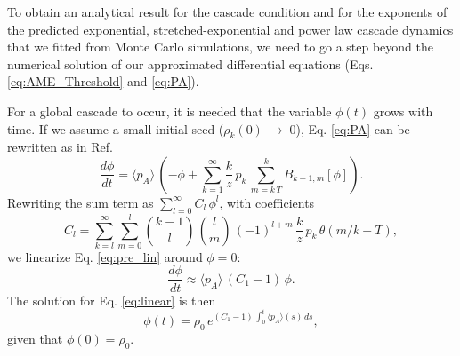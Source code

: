 To obtain an analytical result for the cascade condition and for the exponents of the predicted exponential, stretched-exponential and power law cascade dynamics that we fitted from Monte Carlo simulations, we need to go a step beyond the numerical solution of our approximated differential equations (Eqs. \eqref{eq:AME_Threshold} and \eqref{eq:PA}). 

For a global cascade to occur, it is needed that the variable $\phi(t)$ grows with time. If we assume a small initial seed ($\rho_k (0) \; \to \; 0$), Eq. \eqref{eq:PA} can be rewritten as in Ref. \cite{gleeson-2007}
\begin{equation} %
    \label{eq:pre_lin}
    \frac{d \phi}{dt}  = \langle p_A \rangle \, \left( -\phi + \sum_{k=1}^{\infty} \frac{k}{z} \, p_k \, \sum_{m = k\, T}^{k} B_{k-1,m} [\phi] \right).
\end{equation}
Rewriting the sum term as $\sum_{l=0}^{\infty} C_l \, \phi^l$, with coefficients 
\begin{equation}
    \label{eq:coef_phi}
    C_l = \sum_{k=l}^{\infty} \sum_{m=0}^{l} { k-1 \choose l} \, {l \choose m} \, (-1)^{l+m} \, \frac{k}{z} \, p_k \, \theta\left(m/k - T \right),
\end{equation}
we linearize Eq. \eqref{eq:pre_lin} around $\phi = 0$:
\begin{equation}
    \label{eq:linear}
    \frac{d \phi}{dt} \approx  \langle p_A \rangle \, ( C_1 -1) \, \phi.
\end{equation}
The solution for Eq. \eqref{eq:linear} is then
\begin{equation}
    \label{eq:phi_general}
    \phi(t) = \rho_0\,  e^{(C_1 - 1) \, \int_0^t \langle p_A \rangle (s) \, ds},
\end{equation}
given that $ \phi(0) = \rho_0$.

